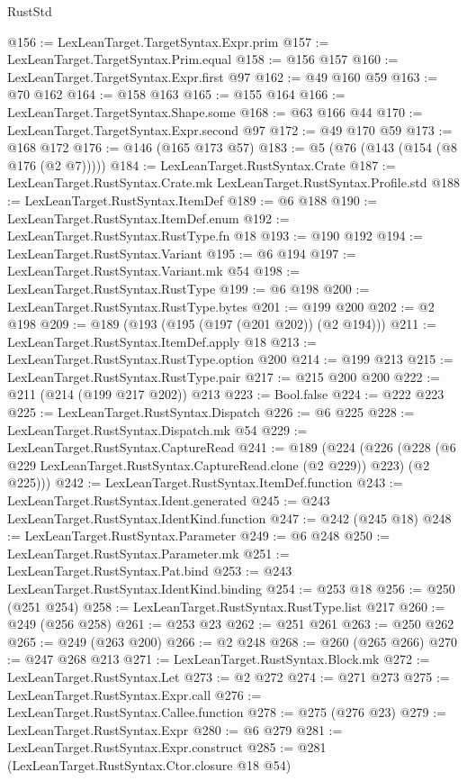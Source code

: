 \begin{lexlean}{RustStd}
\begin{coremodule}
{\begin{coremodule}
{{{{{{{{@156 := LexLeanTarget.TargetSyntax.Expr.prim
@157 := LexLeanTarget.TargetSyntax.Prim.equal
@158 := @156 @157
@160 := LexLeanTarget.TargetSyntax.Expr.first @97
@162 := @49 @160 @59
@163 := @70 @162
@164 := @158 @163
@165 := @155 @164
@166 := LexLeanTarget.TargetSyntax.Shape.some
@168 := @63 @166 @44
@170 := LexLeanTarget.TargetSyntax.Expr.second @97
@172 := @49 @170 @59
@173 := @168 @172
@176 := @146 (@165 @173 @57)
@183 := @5 (@76 (@143 (@154 (@8 @176 (@2 @7)))))
@184 := LexLeanTarget.RustSyntax.Crate
@187 := LexLeanTarget.RustSyntax.Crate.mk LexLeanTarget.RustSyntax.Profile.std
@188 := LexLeanTarget.RustSyntax.ItemDef
@189 := @6 @188
@190 := LexLeanTarget.RustSyntax.ItemDef.enum
@192 := LexLeanTarget.RustSyntax.RustType.fn @18
@193 := @190 @192
@194 := LexLeanTarget.RustSyntax.Variant
@195 := @6 @194
@197 := LexLeanTarget.RustSyntax.Variant.mk @54
@198 := LexLeanTarget.RustSyntax.RustType
@199 := @6 @198
@200 := LexLeanTarget.RustSyntax.RustType.bytes
@201 := @199 @200
@202 := @2 @198
@209 := @189 (@193 (@195 (@197 (@201 @202)) (@2 @194)))
@211 := LexLeanTarget.RustSyntax.ItemDef.apply @18
@213 := LexLeanTarget.RustSyntax.RustType.option @200
@214 := @199 @213
@215 := LexLeanTarget.RustSyntax.RustType.pair
@217 := @215 @200 @200
@222 := @211 (@214 (@199 @217 @202)) @213
@223 := Bool.false
@224 := @222 @223
@225 := LexLeanTarget.RustSyntax.Dispatch
@226 := @6 @225
@228 := LexLeanTarget.RustSyntax.Dispatch.mk @54
@229 := LexLeanTarget.RustSyntax.CaptureRead
@241 := @189
    (@224
      (@226 (@228 (@6 @229 LexLeanTarget.RustSyntax.CaptureRead.clone (@2 @229)) @223) (@2 @225)))
@242 := LexLeanTarget.RustSyntax.ItemDef.function
@243 := LexLeanTarget.RustSyntax.Ident.generated
@245 := @243 LexLeanTarget.RustSyntax.IdentKind.function
@247 := @242 (@245 @18)
@248 := LexLeanTarget.RustSyntax.Parameter
@249 := @6 @248
@250 := LexLeanTarget.RustSyntax.Parameter.mk
@251 := LexLeanTarget.RustSyntax.Pat.bind
@253 := @243 LexLeanTarget.RustSyntax.IdentKind.binding
@254 := @253 @18
@256 := @250 (@251 @254)
@258 := LexLeanTarget.RustSyntax.RustType.list @217
@260 := @249 (@256 @258)
@261 := @253 @23
@262 := @251 @261
@263 := @250 @262
@265 := @249 (@263 @200)
@266 := @2 @248
@268 := @260 (@265 @266)
@270 := @247 @268 @213
@271 := LexLeanTarget.RustSyntax.Block.mk
@272 := LexLeanTarget.RustSyntax.Let
@273 := @2 @272
@274 := @271 @273
@275 := LexLeanTarget.RustSyntax.Expr.call
@276 := LexLeanTarget.RustSyntax.Callee.function
@278 := @275 (@276 @23)
@279 := LexLeanTarget.RustSyntax.Expr
@280 := @6 @279
@281 := LexLeanTarget.RustSyntax.Expr.construct
@285 := @281 (LexLeanTarget.RustSyntax.Ctor.closure @18 @54)
}}}}}}}}
\end{coremodule}}
\end{coremodule}
\end{lexlean}
